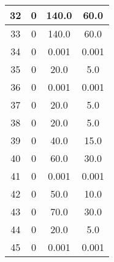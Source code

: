 {\begin{tabular}{|c|c|c|c|}
    32 &  0 &  140.0 &   60.0\\ \hline
    33 &  0 &  140.0 &   60.0\\ \hline
    34 &  0 &  0.001 &  0.001\\ \hline
    35 &  0 &   20.0 &    5.0\\ \hline
    36 &  0 &  0.001 &  0.001\\ \hline
    37 &  0 &   20.0 &    5.0\\ \hline
    38 &  0 &   20.0 &    5.0\\ \hline
    39 &  0 &   40.0 &   15.0\\ \hline
    40 &  0 &   60.0 &   30.0\\ \hline
    41 &  0 &  0.001 &  0.001\\ \hline
    42 &  0 &   50.0 &   10.0\\ \hline
    43 &  0 &   70.0 &   30.0\\ \hline
    44 &  0 &   20.0 &    5.0\\ \hline
    45 &  0 &  0.001 &  0.001\\ \hline
\end{tabular}
}